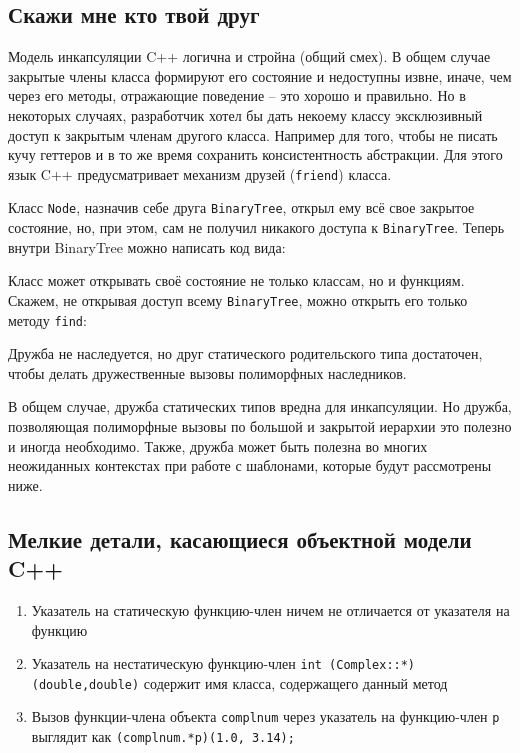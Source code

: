 \documentclass[a4paper,12pt,oneside]{article}
\begin{document}
\subsection{Скажи мне кто твой друг}

Модель инкапсуляции C++ логична и стройна (общий смех). В общем случае закрытые члены класса формируют его состояние и недоступны извне, иначе, чем через его методы, отражающие поведение -- это хорошо и правильно. Но в некоторых случаях, разработчик хотел бы дать некоему классу эксклюзивный доступ к закрытым членам другого класса. Например для того, чтобы не писать кучу геттеров и в то же время сохранить консистентность абстракции. Для этого язык C++ предусматривает механизм друзей (\lstinline!friend!) класса.



Класс \lstinline!Node!, назначив себе друга \lstinline!BinaryTree!, открыл ему всё свое закрытое состояние, но, при этом, сам не получил никакого доступа к \lstinline!BinaryTree!. Теперь внутри BinaryTree можно написать код вида:



Класс может открывать своё состояние не только классам, но и функциям. Скажем, не открывая доступ всему \lstinline!BinaryTree!, можно открыть его только методу \lstinline!find!:



Дружба не наследуется, но друг статического родительского типа достаточен, чтобы делать дружественные вызовы полиморфных наследников.



В общем случае, дружба статических типов вредна для инкапсуляции. Но дружба, позволяющая полиморфные вызовы по большой и закрытой иерархии это полезно и иногда необходимо. Также, дружба может быть полезна во многих неожиданных контекстах при работе с шаблонами, которые будут рассмотрены ниже.

\subsection{Мелкие детали, касающиеся объектной модели C++}

\begin{enumerate}
\item
Указатель на статическую функцию-член ничем не отличается от указателя на функцию
\item
Указатель на нестатическую функцию-член \lstinline!int (Complex::*)(double,double)! содержит имя класса, содержащего данный метод
\item
Вызов функции-члена объекта \lstinline!complnum! через указатель на функцию-член \lstinline!p! выглядит как \lstinline!(complnum.*p)(1.0, 3.14);!
\end{enumerate}
\end{document}
